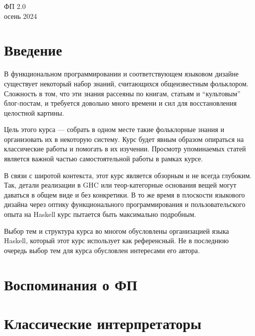 \documentclass[12pt]{article}
\begin{document}
    \begin{center}
    {\LARGE ФП 2.0}
        \\
        осень 2024
    \end{center}

    \tableofcontents

    \newpage

    \section*{Введение}

    В функциональном программировании и соответствующем языковом дизайне существует некоторый набор знаний, считающихся общеизвестным фольклором.
    Сложность в том, что эти знания рассеяны по книгам, статьям и ``культовым'' блог-постам, и требуется довольно много времени и сил для восстановления целостной картины.

    Цель этого курса --- собрать в одном месте такие фольклорные знания и организовать их в некоторую систему.
    Курс будет явным образом опираться на классические работы и помогать в их изучении.
    Просмотр упоминаемых статей является важной частью самостоятельной работы в рамках курсе.

    В связи с широтой контекста, этот курс является обзорным и не всегда глубоким.
    Так, детали реализации в GHC или теор-категорные основания вещей могут даваться в общем виде и без конкретики.
    В то же время в плоскости языкового дизайна через оптику функционального программирования и пользовательского опыта на Haskell курс пытается быть максимально подробным.

    Выбор тем и структура курса во многом обусловлены организацией языка Haskell, который этот курс использует как референсный.
    Не в последнюю очередь выбор тем для курса обусловлен интересами его автора.


    \clearpage


    \section{Воспоминания о ФП}

    

    \clearpage


    \section{Классические интерпретаторы}
\end{document}

